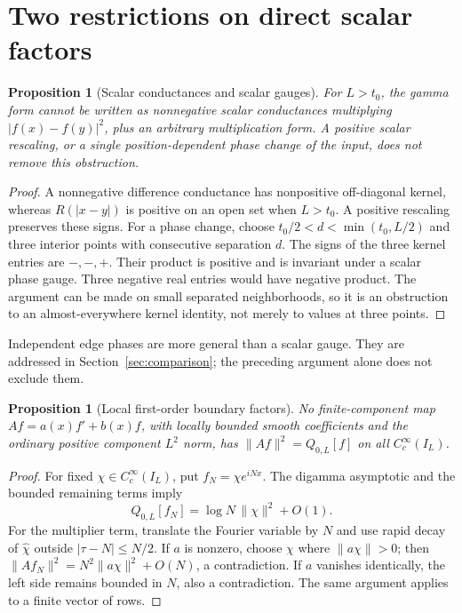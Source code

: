 \documentclass[11pt]{article}
\numberwithin{equation}{section}
\newtheorem{proposition}[theorem]{Proposition}
\theoremstyle{definition}
\theoremstyle{remark}
\newcommand{\norm}[1]{\lVert#1\rVert}
\begin{document}
\section{Two restrictions on direct scalar factors}
\label{sec:direct}

\begin{proposition}[Scalar conductances and scalar gauges]
For $L>t_0$, the gamma form cannot be written as nonnegative scalar
conductances multiplying $|f(x)-f(y)|^2$, plus an arbitrary multiplication
form. A positive scalar rescaling, or a single position-dependent phase
change of the input, does not remove this obstruction.
\end{proposition}
\begin{proof}
A nonnegative difference conductance has nonpositive off-diagonal kernel,
whereas $R(|x-y|)$ is positive on an open set when $L>t_0$.
A positive rescaling preserves these signs. For a phase change, choose
$t_0/2<d<\min(t_0,L/2)$ and three interior points with consecutive
separation $d$. The signs of the three kernel entries are $-,-,+$.
Their product is positive and is invariant under a scalar phase gauge.
Three negative real entries would have negative product. The argument can
be made on small separated neighborhoods, so it is an obstruction to an
almost-everywhere kernel identity, not merely to values at three points.
\end{proof}

Independent edge phases are more general than a scalar gauge. They are
addressed in Section~\ref{sec:comparison}; the preceding argument alone
does not exclude them.

\begin{proposition}[Local first-order boundary factors]
No finite-component map $Af=a(x)f'+b(x)f$, with locally bounded smooth
coefficients and the ordinary positive component $L^2$ norm, has
$\norm{Af}^2=Q_{0,L}[f]$ on all $C_c^\infty(I_L)$.
\end{proposition}
\begin{proof}
For fixed $\chi\in C_c^\infty(I_L)$, put $f_N=\chi e^{iNx}$.
The digamma asymptotic and the bounded remaining terms imply
\begin{equation}
Q_{0,L}[f_N]=\log N\,\norm\chi^2+O(1).
\end{equation}
For the multiplier term, translate the Fourier variable by $N$ and use
rapid decay of $\widehat\chi$ outside $|\tau-N|\leq N/2$.
If $a$ is nonzero, choose $\chi$ where $\norm{a\chi}>0$; then
$\norm{Af_N}^2=N^2\norm{a\chi}^2+O(N)$, a contradiction.
If $a$ vanishes identically, the left side remains bounded in $N$, also a
contradiction. The same argument applies to a finite vector of rows.
\end{proof}
\end{document}
